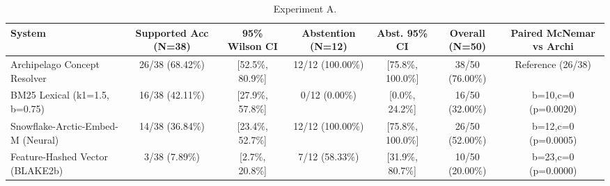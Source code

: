 \begin{table}[t]
\centering
\caption{Experiment A.}
\label{tab:t2_concept}
\small
\begin{tabular}{@{}lcccccc@{}}
\toprule
\textbf{System} & \textbf{Supported Acc (N=38)} & \textbf{95\% Wilson CI} & \textbf{Abstention (N=12)} & \textbf{Abst. 95\% CI} & \textbf{Overall (N=50)} & \textbf{Paired McNemar vs Archi} \\
\midrule
Archipelago Concept Resolver & 26/38 (68.42\%) & [52.5\%, 80.9\%] & 12/12 (100.00\%) & [75.8\%, 100.0\%] & 38/50 (76.00\%) & Reference (26/38) \\
BM25 Lexical (k1=1.5, b=0.75) & 16/38 (42.11\%) & [27.9\%, 57.8\%] & 0/12 (0.00\%) & [0.0\%, 24.2\%] & 16/50 (32.00\%) & b=10,c=0 (p=0.0020) \\
Snowflake-Arctic-Embed-M (Neural) & 14/38 (36.84\%) & [23.4\%, 52.7\%] & 12/12 (100.00\%) & [75.8\%, 100.0\%] & 26/50 (52.00\%) & b=12,c=0 (p=0.0005) \\
Feature-Hashed Vector (BLAKE2b) & 3/38 (7.89\%) & [2.7\%, 20.8\%] & 7/12 (58.33\%) & [31.9\%, 80.7\%] & 10/50 (20.00\%) & b=23,c=0 (p=0.0000) \\
\bottomrule
\end{tabular}
\end{table}
